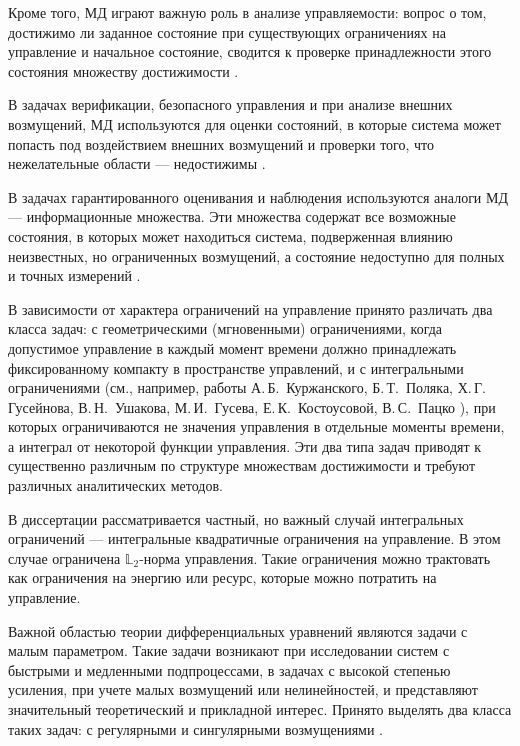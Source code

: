 \documentclass[../main.tex]{subfiles}
\begin{document}
Кроме того, МД играют важную роль в анализе управляемости: вопрос о том, достижимо ли заданное состояние при существующих ограничениях на управление и начальное состояние, сводится к проверке принадлежности этого состояния множеству достижимости \cite{Kur1, Kurzhanski1977}.

В задачах верификации, безопасного управления и при анализе внешних возмущений, МД используются для оценки состояний, в которые система может попасть под воздействием внешних возмущений и проверки того, что нежелательные области --- недостижимы \cite{Mitchell, Filippova2015}. 

В задачах гарантированного оценивания и наблюдения используются аналоги МД --- информационные множества. 
Эти множества содержат все возможные состояния, в которых может находиться система, подверженная влиянию неизвестных, но ограниченных возмущений, а состояние недоступно для полных и точных измерений \cite{Kurzhanski1977, Kur1, Schweppe, bi2000, Patsko2019}.

В зависимости от характера ограничений на управление принято различать два класса задач: с геометрическими (мгновенными) ограничениями, когда допустимое управление в каждый момент времени должно принадлежать фиксированному компакту в пространстве управлений, и с интегральными ограничениями (см., например, работы А.\,Б.~Куржанского, Б.\,Т.~Поляка, Х.\,Г.~ Гусейнова, В.\,Н.~Ушакова, М.\,И.~Гусева, Е.\,К.~Костоусовой, В.\,С.~Пацко \cite{Kur1, Polyak2004, Guseinov2007, Guseinov2009, Guseinov2010, Guseinov2024, GusZyk, Kostousova,Patsko2023}), при которых ограничиваются не значения управления в отдельные моменты времени, а интеграл от некоторой функции управления. 
Эти два типа задач приводят к существенно различным по структуре множествам достижимости и требуют различных аналитических методов.

В диссертации рассматривается частный, но важный случай интегральных ограничений --- интегральные квадратичные ограничения на управление. 
В этом случае ограничена $\mathbb{L}_2$-норма управления. 
Такие ограничения можно трактовать как ограничения на энергию или ресурс, которые можно потратить на управление. 

Важной областью теории дифференциальных уравнений являются задачи с малым параметром.
Такие задачи возникают при исследовании систем с быстрыми и медленными подпроцессами, в задачах с высокой степенью усиления, при учете малых возмущений или нелинейностей, и представляют значительный теоретический и прикладной интерес. 
Принято выделять два класса таких задач: с регулярными и сингулярными возмущениями \cite{Tihonov1948,Tihonov1952}.
\end{document}
